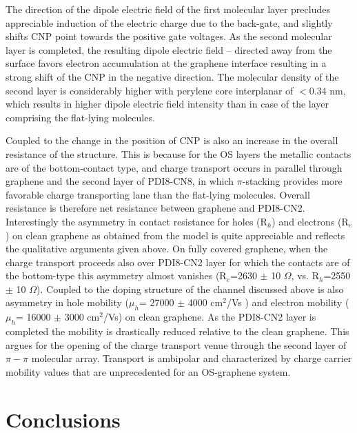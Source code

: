 \documentclass[preprint,aip,jap]{revtex4-2}
\begin{document}
  The direction of the dipole electric field of the first molecular layer precludes appreciable induction of the electric charge due to the back-gate, and slightly shifts CNP point towards the positive gate voltages.
 As the second molecular layer is completed, the resulting dipole electric field -- directed away from the surface favors electron accumulation at the graphene interface resulting in a strong shift of the CNP in the negative direction.
  The molecular density of the second layer is considerably higher with perylene core interplanar of $< 0.34$ nm, which results in higher dipole electric field intensity than in  case of the layer comprising the flat-lying molecules.


Coupled to the change in the position of CNP is also an increase in the overall resistance of the structure.
 This is because for the OS layers the metallic contacts are of the  bottom-contact type, and charge transport occurs in parallel through graphene and the second layer of PDI8-CN8, in which $\pi$-stacking provides more favorable charge transporting lane than the flat-lying molecules.
 Overall resistance is therefore net resistance between graphene and PDI8-CN2.
 Interestingly the asymmetry in contact resistance for holes (R$_{h}$) and  electrons  (R$_{e}$) on clean graphene as obtained from the model is quite appreciable and reflects the qualitative arguments given above.
  On fully covered graphene, when the charge transport proceeds also over PDI8-CN2 layer for which the contacts are of the bottom-type this asymmetry almost vanishes (R$_{e}$=2630 $\pm$ 10 $\Omega$, vs. R$_{h}$=2550 $\pm$ 10 $\Omega$).
  Coupled to the doping structure of the channel discussed above is also asymmetry in hole mobility  ($\mu_{h}$= 27000 $\pm$ 4000 cm$^{2}$/Vs ) and electron mobility ($\mu_{h}$= 16000 $\pm$ 3000 cm$^{2}$/Vs) on clean graphene.
 As the PDI8-CN2 layer is completed the mobility is drastically reduced relative to the clean graphene.
  This argues for the opening of the charge transport venue through the second layer of $\pi-\pi$ molecular array.
 Transport is ambipolar and characterized by charge carrier mobility values that are unprecedented for an OS-graphene system.
  

\section{Conclusions}
\label{sec:conc}
\end{document}
